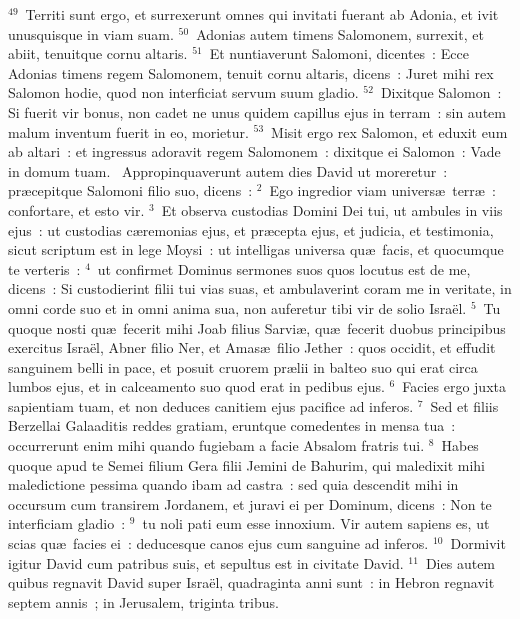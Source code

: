 ${}^{49}$~Territi sunt ergo, et surrexerunt omnes qui invitati fuerant ab Adonia, et ivit unusquisque in viam suam.
${}^{50}$~Adonias autem timens Salomonem, surrexit, et abiit, tenuitque cornu altaris.
${}^{51}$~Et nuntiaverunt Salomoni, dicentes~: Ecce Adonias timens regem Salomonem, tenuit cornu altaris, dicens~: Juret mihi rex Salomon hodie, quod non interficiat servum suum gladio.
${}^{52}$~Dixitque Salomon~: Si fuerit vir bonus, non cadet ne unus quidem capillus ejus in terram~: sin autem malum inventum fuerit in eo, morietur.
${}^{53}$~Misit ergo rex Salomon, et eduxit eum ab altari~: et ingressus adoravit regem Salomonem~: dixitque ei Salomon~: Vade in domum tuam.
~Appropinquaverunt autem dies David ut moreretur~: pr\ae cepitque Salomoni filio suo, dicens~:
${}^{2}$~Ego ingredior viam univers\ae\ terr\ae~: confortare, et esto vir.
${}^{3}$~Et observa custodias Domini Dei tui, ut ambules in viis ejus~: ut custodias c\ae remonias ejus, et pr\ae cepta ejus, et judicia, et testimonia, sicut scriptum est in lege Moysi~: ut intelligas universa qu\ae\ facis, et quocumque te verteris~:
${}^{4}$~ut confirmet Dominus sermones suos quos locutus est de me, dicens~: Si custodierint filii tui vias suas, et ambulaverint coram me in veritate, in omni corde suo et in omni anima sua, non auferetur tibi vir de solio Isra\"el.
${}^{5}$~Tu quoque nosti qu\ae\ fecerit mihi Joab filius Sarvi\ae , qu\ae\ fecerit duobus principibus exercitus Isra\"el, Abner filio Ner, et Amas\ae\ filio Jether~: quos occidit, et effudit sanguinem belli in pace, et posuit cruorem pr\ae lii in balteo suo qui erat circa lumbos ejus, et in calceamento suo quod erat in pedibus ejus.
${}^{6}$~Facies ergo juxta sapientiam tuam, et non deduces canitiem ejus pacifice ad inferos.
${}^{7}$~Sed et filiis Berzellai Galaaditis reddes gratiam, eruntque comedentes in mensa tua~: occurrerunt enim mihi quando fugiebam a facie Absalom fratris tui.
${}^{8}$~Habes quoque apud te Semei filium Gera filii Jemini de Bahurim, qui maledixit mihi maledictione pessima quando ibam ad castra~: sed quia descendit mihi in occursum cum transirem Jordanem, et juravi ei per Dominum, dicens~: Non te interficiam gladio~:
${}^{9}$~tu noli pati eum esse innoxium. Vir autem sapiens es, ut scias qu\ae\ facies ei~: deducesque canos ejus cum sanguine ad inferos.
${}^{10}$~Dormivit igitur David cum patribus suis, et sepultus est in civitate David.
${}^{11}$~Dies autem quibus regnavit David super Isra\"el, quadraginta anni sunt~: in Hebron regnavit septem annis~; in Jerusalem, triginta tribus.


